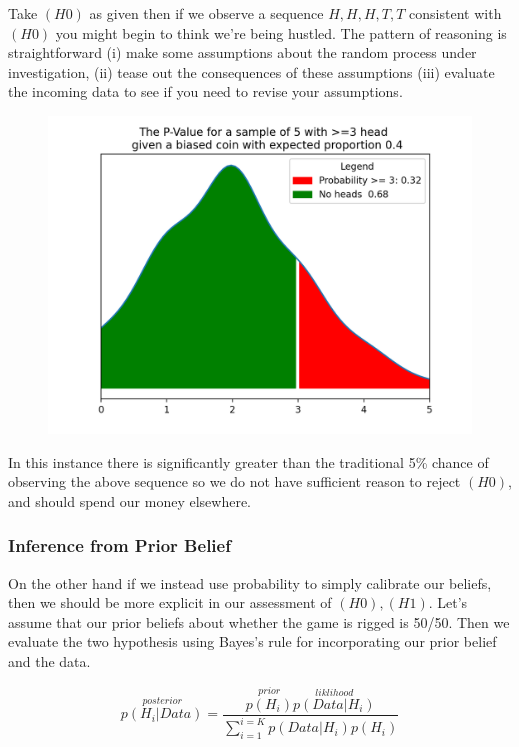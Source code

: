 \documentclass[10pt,a4paper,notitlepage, twocolumn]{article}
\begin{document}
\noindent Take $(H0)$ as given then if we observe a sequence $H, H, H, T, T$ consistent with $(H0)$ you might begin to think we're being hustled. The pattern of reasoning is straightforward (i) make some assumptions about the random process under investigation, (ii) tease out the consequences of these assumptions (iii) evaluate the incoming data to see if you need to revise your assumptions. 

\begin{figure}[H]
  \includegraphics[width=\linewidth]{./Plots/binomial_test.png}
\end{figure}

In this instance there is significantly greater than the traditional 5\% chance of observing the above sequence so we do not have sufficient reason to reject $(H0)$, and should spend our money elsewhere. 

\subsubsection*{Inference from Prior Belief}
On the other hand if we instead use probability to simply calibrate our beliefs, then we should be more explicit in our assessment of $(H0), (H1)$. Let's assume that our prior beliefs about whether the game is rigged is 50/50. Then we evaluate the two hypothesis using Bayes's rule for incorporating our prior belief and the data. 

$$ \overset{posterior}{p(H_{i} | Data)} = \frac{\overset{prior}{p(H_{i})}\overset{liklihood}{p(Data | H_{i})}}{\sum_{i=1}^{i =K} p(Data | H_{i})p(H_i)}$$
\end{document}
